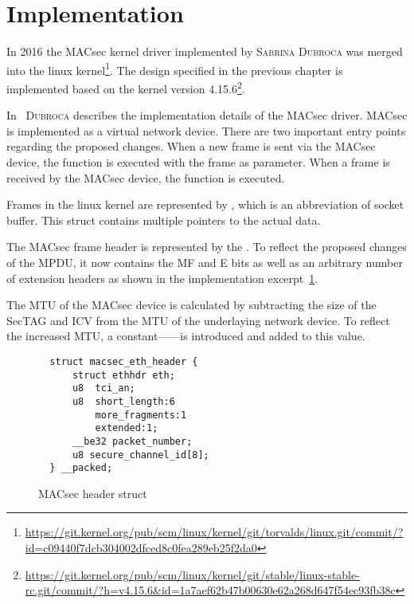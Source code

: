 \section{Implementation}
\label{ch:implementation}
In 2016 the \gls{MACsec} kernel driver implemented by \textsc{Sabrina Dubroca} was merged into the linux kernel\footnote{\url{https://git.kernel.org/pub/scm/linux/kernel/git/torvalds/linux.git/commit/?id=c09440f7dcb304002dfced8c0fea289eb25f2da0}}.
The design specified in the previous chapter is implemented based on the kernel version 4.15.6\footnote{\url{https://git.kernel.org/pub/scm/linux/kernel/git/stable/linux-stable-rc.git/commit/?h=v4.15.6&id=1a7aef62b47b00630e62a268d647f54ec93fb38c}}.

In~\cite{dubrocamacsec} \textsc{Dubroca} describes the implementation details of the \gls{MACsec} driver.
\gls{MACsec} is implemented as a virtual network device.
There are two important entry points regarding the proposed changes.
When a new frame is sent via the \gls{MACsec} device, the function  is executed with the frame as parameter.
When a frame is received by the \gls{MACsec} device, the   function is executed.

Frames in the linux kernel are represented by , which is an abbreviation of socket buffer.
This struct contains multiple pointers to the actual data.

The \gls{MACsec} frame header is represented by the .
To reflect the proposed changes of the \gls{MPDU}, it now contains the \acrlong{MF} and \acrlong{E} bits as well as an arbitrary number of extension headers as shown in the implementation excerpt~\ref{lst:macsec-hdr}.

The \gls{MTU} of the \gls{MACsec} device is calculated by subtracting the size of the \gls{SecTAG} and \gls{ICV} from the \gls{MTU} of the underlaying network device.
To reflect the increased \gls{MTU}, a constant------is introduced and added to this value.
\begin{figure}
  \lstset{language=C}
  \begin{lstlisting}
  struct macsec_eth_header {
      struct ethhdr eth;
      u8  tci_an;
      u8  short_length:6
          more_fragments:1
          extended:1;
      __be32 packet_number;
      u8 secure_channel_id[8];
  } __packed;
  \end{lstlisting}
  \caption{\acrshort{MACsec} header struct}
  \label{lst:macsec-hdr}
\end{figure}

